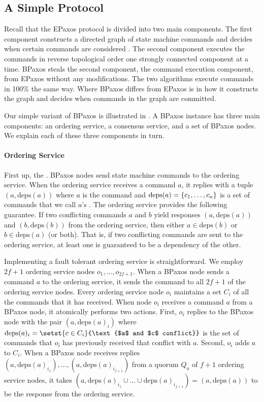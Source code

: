 \documentclass{mwhittaker}
\begin{document}
\subsection{A Simple Protocol}
Recall that the EPaxos protocol is divided into two main components. The first
component constructs a directed graph of state machine commands and decides
when certain commands are considered . The second component
executes the commands in reverse topological order one strongly connected
component at a time. BPaxos steals the second component, the command execution
component, from EPaxos without any modifications. The two algorithms execute
commands in 100\% the same way. Where BPaxos differs from EPaxos is in how it
constructs the graph and decides when commands in the graph are committed.

Our simple variant of BPaxos is illustrated in . A BPaxos
instance has three main components: an ordering service, a consensus service,
and a set of BPaxos nodes. We explain each of these three components in turn.

{}

\paragraph{Ordering Service}
\newcommand{\deps}[1]{\text{deps}(#1)}

First up, the . BPaxos nodes send state machine
commands to the ordering service. When the ordering service receives a command
$a$, it replies with a tuple $(a, \deps{a})$ where $a$ is the command and
$\deps{a} = \set{c_1, \ldots, c_n}$ is a set of commands that we call $a$'s
. The ordering service provides the following guarantee.
If two conflicting commands $a$ and $b$ yield responses $(a, \deps{a})$ and $(b,
\deps{b})$ from the ordering service, then either $a \in \deps{b}$ or $b \in
\deps{a}$ (or both). That is, if two conflicting commands are sent to the
ordering service, at least one is guaranteed to be a dependency of the other.

Implementing a fault tolerant ordering service is straightforward. We employ
$2f + 1$ ordering service nodes $o_{1}, \ldots, o_{2f + 1}$. When a BPaxos node
sends a command $a$ to the ordering service, it sends the command to all $2f +
1$ of the ordering service nodes. Every ordering service node $o_i$ maintains a
set $C_i$ of all the commands that it has received. When node $o_i$ receives a
command $a$ from a BPaxos node, it atomically performs two actions. First,
$o_i$ replies to the BPaxos node with the pair $(a, \deps{a}_i)$ where
$\deps{a}_i = \setst{c \in C_i}{\text{$a$ and $c$ conflict}}$ is the set of
commands that $o_i$ has previously received that conflict with $a$. Second,
$o_i$ adds $a$ to $C_i$. When a BPaxos node receives replies $(a,
\deps{a}_{i_1}), \ldots, (a, \deps{a}_{i_{f+1}})$ from a quorum $Q_a$ of $f +
1$ ordering service nodes, it takes $(a, \deps{a}_{i_1} \cup \ldots \cup
\deps{a}_{i_{f+1}}) = (a, \deps{a})$ to be the response from the ordering
service.
\end{document}
